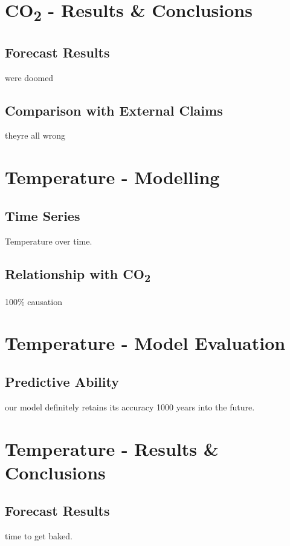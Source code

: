\documentclass{mcmthesis}
\begin{document}
    \section{CO\textsubscript{2} - Results \& Conclusions}

    \subsection{Forecast Results}
    we\textquotesingle re doomed


    \subsection{Comparison with External Claims}
    they\textquotesingle re all wrong



    \section{Temperature - Modelling}

    \subsection{Time Series}
    Temperature over time.


    \subsection{Relationship with CO\textsubscript{2}}
    100\% causation



    \section{Temperature - Model Evaluation}

    \subsection{Predictive Ability}
    our model definitely retains its accuracy 1000 years into the future.



    \section{Temperature - Results \& Conclusions}

    \subsection{Forecast Results}
    time to get baked.
\end{document}
